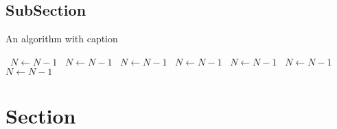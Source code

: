 \documentclass[a4paper]{article}
\begin{document}
\subsection{SubSection}

\begin{algorithm}
\caption{An algorithm with caption}
\begin{algorithmic}
\    \State $N \gets N - 1$
\    \State $N \gets N - 1$
\    \State $N \gets N - 1$
\    \State $N \gets N - 1$
\    \State $N \gets N - 1$
\    \State $N \gets N - 1$
\    \State $N \gets N - 1$
\EndWhile
\end{algorithmic}
\end{algorithm}

\section{Section}
\end{document}
